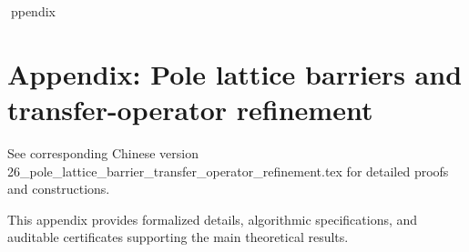 ppendix

\section*{Appendix: Pole lattice barriers and transfer-operator refinement}

See corresponding Chinese version 26_pole_lattice_barrier_transfer_operator_refinement.tex for detailed proofs and constructions.

This appendix provides formalized details, algorithmic specifications, and auditable certificates supporting the main theoretical results.
